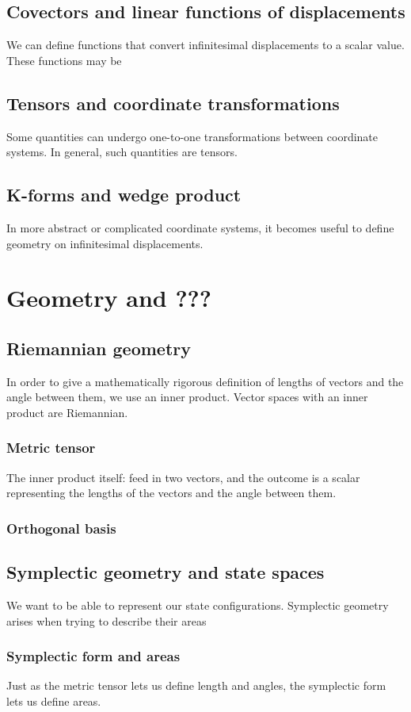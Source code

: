 \documentclass{book}
\begin{document}
\section{Covectors and linear functions of displacements}
We can define functions that convert infinitesimal displacements to a scalar value. These functions may be 
\section{Tensors and coordinate transformations}
Some quantities can undergo one-to-one transformations between coordinate systems. In general, such quantities are tensors. 
\section{K-forms and wedge product}
In more abstract or complicated coordinate systems, it becomes useful to define geometry on infinitesimal displacements. 
\chapter{Geometry and ???}

\section{Riemannian geometry}
In order to give a mathematically rigorous definition of lengths of vectors and the angle between them, we use an inner product. Vector spaces with an inner product are Riemannian. 
\subsection{Metric tensor}
The inner product itself: feed in two vectors, and the outcome is a scalar representing the lengths of the vectors and the angle between them. 
\subsection{Orthogonal basis}

\section{Symplectic geometry and state spaces}
We want to be able to represent our state configurations. Symplectic geometry arises when trying to describe their areas

\subsection{Symplectic form and areas}
Just as the metric tensor lets us define length and angles, the symplectic form lets us define areas. 
\end{document}
